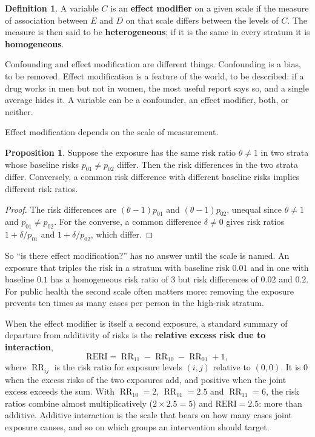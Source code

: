 \documentclass[11pt,a4paper]{article}
\numberwithin{equation}{section}
\DeclareMathOperator{\RR}{RR}
\theoremstyle{definition}
\newtheorem{defn}[thm]{Definition}
\newtheorem{prop}[thm]{Proposition}
\begin{document}
\begin{defn}
A variable $C$ is an \textbf{effect modifier} on a given scale if the measure of association between $E$ and $D$ on that scale differs between the
levels of $C$. The measure is then said to be \textbf{heterogeneous}; if it is the same in every stratum it is \textbf{homogeneous}.
\end{defn}

Confounding and effect modification are different things. Confounding is a bias, to be removed. Effect modification is a feature of the
world, to be described: if a drug works in men but not in women, the most useful report says so, and a single average hides it. A variable
can be a confounder, an effect modifier, both, or neither.

Effect modification depends on the scale of measurement.

\begin{prop}
\label{prop:scale}
Suppose the exposure has the same risk ratio $\theta \neq 1$ in two strata whose baseline risks $p_{01} \neq p_{02}$ differ. Then the risk differences in the
two strata differ. Conversely, a common risk difference with different baseline risks implies different risk ratios.
\end{prop}

\begin{proof}
The risk differences are $(\theta - 1)p_{01}$ and $(\theta - 1)p_{02}$, unequal since $\theta \neq 1$ and $p_{01} \neq p_{02}$. For the converse, a common difference $\delta \neq 0$ gives risk
ratios $1 + \delta/p_{01}$ and $1 + \delta/p_{02}$, which differ.
\end{proof}

So ``is there effect modification?'' has no answer until the scale is named. An exposure that triples the risk in a stratum with baseline
risk $0.01$ and in one with baseline $0.1$ has a homogeneous risk ratio of $3$ but risk differences of $0.02$ and $0.2$. For public health the
second scale often matters more: removing the exposure prevents ten times as many cases per person in the high-risk stratum.

When the effect modifier is itself a second exposure, a standard summary of departure from additivity of risks is the \textbf{relative
excess risk due to interaction},
\[
\text{RERI} = \RR_{11} - \RR_{10} - \RR_{01} + 1 ,
\]
where $\RR_{ij}$ is the risk ratio for exposure levels $(i, j)$ relative to $(0, 0)$. It is $0$ when the excess risks of the two exposures add, and
positive when the joint excess exceeds the sum. With $\RR_{10} = 2$, $\RR_{01} = 2.5$ and $\RR_{11} = 6$, the risk ratios combine almost multiplicatively ($2 \times 2.5 = 5$)
and $\text{RERI} = 2.5$: more than additive. Additive interaction is the scale that bears on how many cases joint exposure causes, and so on
which groups an intervention should target.
\end{document}

